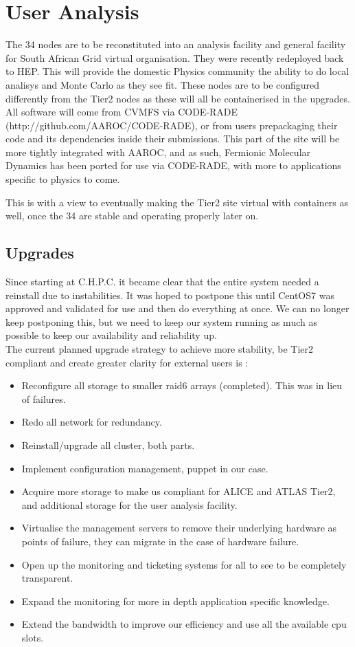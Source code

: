 \documentclass[a4paper]{jpconf}
\begin{document}
\section{User Analysis}
The 34 nodes are to be reconstituted into an analysis facility and general facility for 
South African Grid virtual organisation. They were recently redeployed back to HEP. This will provide the domestic Physics community 
the ability to do local analisys and Monte Carlo as they see fit. 
These nodes are to be configured differently from the Tier2 nodes as these will all be containerised in the upgrades.
All software will come from CVMFS via CODE-RADE (http://github.com/AAROC/CODE-RADE), or from users prepackaging their code and its dependencies inside their submissions.
This part of the site will be more tightly integrated with AAROC, and as such, Fermionic Molecular Dynamics has been ported for use via CODE-RADE, with more to applications
specific to physics to come.

This is with a view to eventually making the Tier2 site virtual with containers as well, once the 34 are stable and operating properly later on.
\subsection{Upgrades}
Since starting at C.H.P.C. it became clear that the entire system needed a reinstall due to instabilities. It was hoped to postpone this until
CentOS7 was approved and validated for use and then do everything at once. We can no longer keep postponing this, but we need to keep our system running as 
much as possible to keep our availability and reliability up.\\

The current planned upgrade strategy to achieve more stability, be Tier2 compliant and create greater clarity for external users is :
\begin{itemize}
  \item Reconfigure all storage to smaller raid6 arrays (completed). This was in lieu of failures.
  \item Redo all network for redundancy.
  \item Reinstall/upgrade all cluster, both parts. 
  \item Implement configuration management, puppet in our case.
  \item Acquire more storage to make us compliant for ALICE and ATLAS Tier2, and additional storage for the user analysis facility.
  \item Virtualise the management servers to remove their underlying hardware as points of failure, they can migrate in the case of hardware failure.
  \item Open up the monitoring and ticketing systems for all to see to be completely transparent.
  \item Expand the monitoring for more in depth application specific knowledge.
  \item Extend the bandwidth to improve our efficiency and use all the available cpu slots.
\end{itemize}
 
\end{document}
